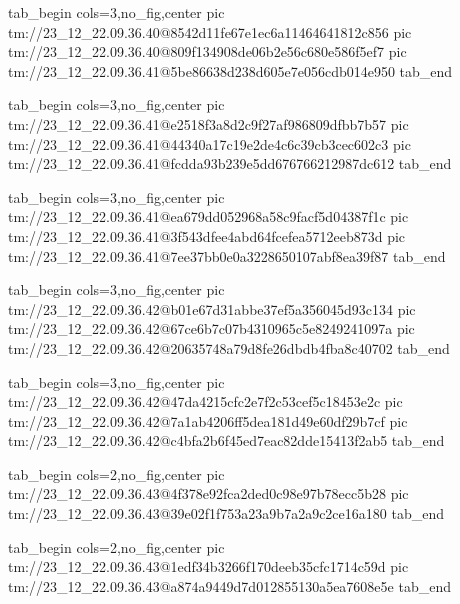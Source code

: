  
 
 
 
 

\qqSecCmtScr


\ifcmt
  tab_begin cols=3,no_fig,center
    pic tm://23_12_22.09.36.40@8542d11fe67e1ec6a11464641812c856
    pic tm://23_12_22.09.36.40@809f134908de06b2e56c680e586f5ef7
    pic tm://23_12_22.09.36.41@5be86638d238d605e7e056cdb014e950
  tab_end
\fi


\ifcmt
  tab_begin cols=3,no_fig,center
    pic tm://23_12_22.09.36.41@e2518f3a8d2c9f27af986809dfbb7b57
    pic tm://23_12_22.09.36.41@44340a17c19e2de4c6c39cb3cec602c3
    pic tm://23_12_22.09.36.41@fcdda93b239e5dd676766212987dc612
  tab_end
\fi


\ifcmt
  tab_begin cols=3,no_fig,center
    pic tm://23_12_22.09.36.41@ea679dd052968a58c9facf5d04387f1c
    pic tm://23_12_22.09.36.41@3f543dfee4abd64fcefea5712eeb873d
    pic tm://23_12_22.09.36.41@7ee37bb0e0a3228650107abf8ea39f87
  tab_end
\fi


\ifcmt
  tab_begin cols=3,no_fig,center
    pic tm://23_12_22.09.36.42@b01e67d31abbe37ef5a356045d93c134
    pic tm://23_12_22.09.36.42@67ce6b7c07b4310965c5e8249241097a
    pic tm://23_12_22.09.36.42@20635748a79d8fe26dbdb4fba8c40702
  tab_end
\fi


\ifcmt
  tab_begin cols=3,no_fig,center
    pic tm://23_12_22.09.36.42@47da4215cfc2e7f2c53cef5c18453e2c
    pic tm://23_12_22.09.36.42@7a1ab4206ff5dea181d49e60df29b7cf
    pic tm://23_12_22.09.36.42@c4bfa2b6f45ed7eac82dde15413f2ab5
  tab_end
\fi


\ifcmt
  tab_begin cols=2,no_fig,center
    pic tm://23_12_22.09.36.43@4f378e92fca2ded0c98e97b78ecc5b28
    pic tm://23_12_22.09.36.43@39e02f1f753a23a9b7a2a9c2ce16a180
  tab_end
\fi


\ifcmt
  tab_begin cols=2,no_fig,center
    pic tm://23_12_22.09.36.43@1edf34b3266f170deeb35cfc1714c59d
    pic tm://23_12_22.09.36.43@a874a9449d7d012855130a5ea7608e5e
  tab_end
\fi


